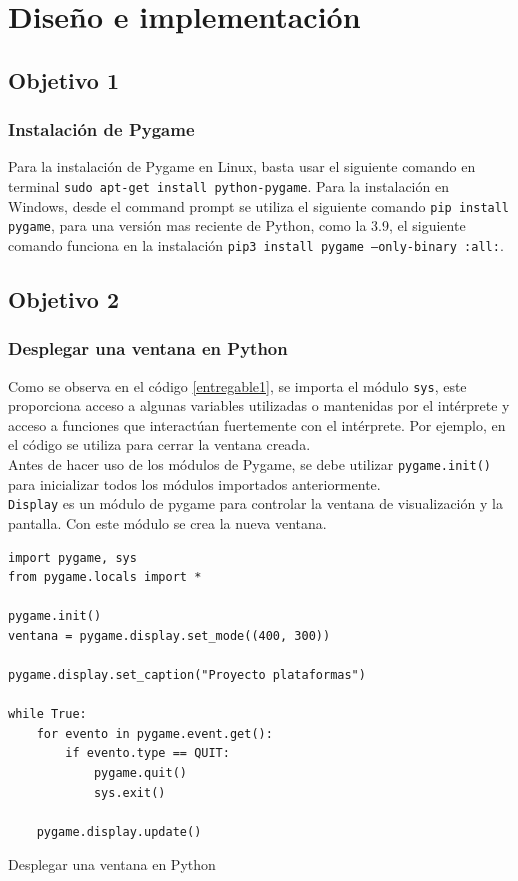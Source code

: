 \documentclass[12pt,letterpaper]{article}
\begin{document}
\section{Diseño e implementación}
\subsection{Objetivo 1}
\subsubsection{Instalación de Pygame}
Para la instalación de Pygame en Linux, basta usar el siguiente comando en terminal \texttt{sudo apt-get install python-pygame}. Para la instalación en Windows, desde el command prompt se utiliza el siguiente comando \texttt{pip install pygame}, para una versión mas reciente de Python, como la 3.9, el siguiente comando funciona en la instalación \texttt{pip3 install pygame --only-binary :all:}.

\subsection{Objetivo 2}
\subsubsection{Desplegar una ventana en Python} \label{objetivo2}
 Como se observa en el código \ref{entregable1}, se importa el módulo \texttt{sys}, este proporciona acceso a algunas variables utilizadas o mantenidas por el intérprete y acceso a funciones que interactúan fuertemente con el intérprete. Por ejemplo, en el código se utiliza para cerrar la ventana creada.\vspace{5mm}\\
\indent Antes de hacer uso de los módulos de Pygame, se debe utilizar \texttt{pygame.init()} para inicializar todos los módulos importados anteriormente.\vspace{5mm}\\
\indent\texttt{Display} es un módulo de pygame para controlar la ventana de visualización y la pantalla. Con este módulo se crea la nueva ventana.
\begin{listing}[H]
\begin{verbatim}
import pygame, sys
from pygame.locals import *

pygame.init()
ventana = pygame.display.set_mode((400, 300))

pygame.display.set_caption("Proyecto plataformas")

while True:
    for evento in pygame.event.get():
        if evento.type == QUIT:
            pygame.quit()
            sys.exit()

    pygame.display.update()

\end{verbatim}
\caption{Desplegar una ventana en Python}
\label{entregable1}
\end{listing}
\end{document}
